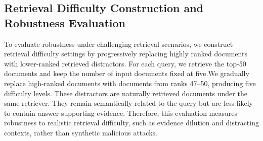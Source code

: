 \documentclass[11pt]{article}
\begin{document}
\subsection{Retrieval Difficulty Construction and Robustness Evaluation}

To evaluate robustness under challenging retrieval scenarios, we construct retrieval difficulty settings by progressively replacing highly ranked documents with lower-ranked retrieved distractors.
For each query, we retrieve the top-50 documents and keep the number of input documents fixed at five.We gradually replace high-ranked documents with documents from ranks 47--50, producing five difficulty levels.
These distractors are naturally retrieved documents under the same retriever. They remain semantically related to the query but are less likely to contain answer-supporting evidence.
Therefore, this evaluation measures robustness to realistic retrieval difficulty, such as evidence dilution and distracting contexts, rather than synthetic malicious attacks.
\end{document}
